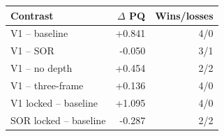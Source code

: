 \begin{tabular}{lrr}
\toprule
Contrast & $\Delta$ PQ & Wins/losses \\
\midrule
V1 -- baseline & +0.841 & 4/0 \\
V1 -- SOR & -0.050 & 3/1 \\
V1 -- no depth & +0.454 & 2/2 \\
V1 -- three-frame & +0.136 & 4/0 \\
V1 locked -- baseline & +1.095 & 4/0 \\
SOR locked -- baseline & -0.287 & 2/2 \\
\bottomrule
\end{tabular}
